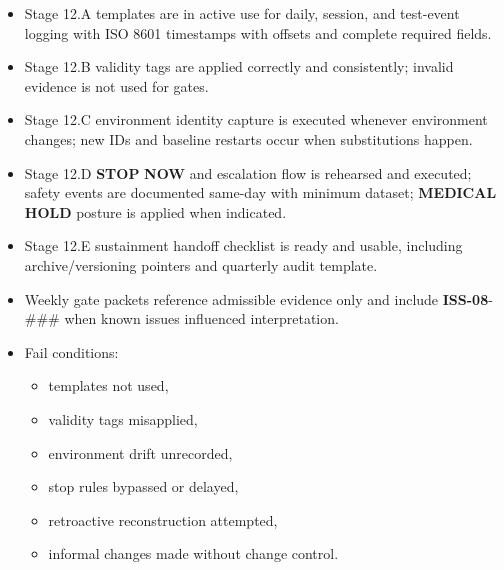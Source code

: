 \documentclass[10pt]{article}
\begin{document}
\begin{itemize}
\item Stage 12.A templates are in active use for daily, session, and test-event logging with ISO 8601 timestamps with offsets and complete required fields.
\item Stage 12.B validity tags are applied correctly and consistently; invalid evidence is not used for gates.
\item Stage 12.C environment identity capture is executed whenever environment changes; new IDs and baseline restarts occur when substitutions happen.
\item Stage 12.D \textbf{STOP} \textbf{NOW} and escalation flow is rehearsed and executed; safety events are documented same-day with minimum dataset; \textbf{MEDICAL} \textbf{HOLD} posture is applied when indicated.
\item Stage 12.E sustainment handoff checklist is ready and usable, including archive/versioning pointers and quarterly audit template.
\item Weekly gate packets reference admissible evidence only and include \textbf{ISS-08}-\#\#\# when known issues influenced interpretation.
\item Fail conditions:
  \begin{itemize}
  \item templates not used,
  \item validity tags misapplied,
  \item environment drift unrecorded,
  \item stop rules bypassed or delayed,
  \item retroactive reconstruction attempted,
  \item informal changes made without change control.
  \end{itemize}
\end{itemize}
\end{document}
